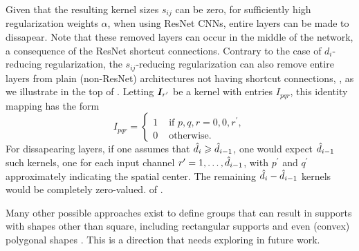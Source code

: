 Given that the resulting kernel sizes $s_{ij}$ can be zero, for sufficiently high regularization weights $\alpha$, when using ResNet CNNs, entire layers can be made to dissapear. Note that these removed layers can occur in the middle of the network, a consequence of the ResNet shortcut connections. Contrary to the case of $d_{i}$-reducing regularization, the $s_{ij}$-reducing regularization can also remove entire layers from plain (non-ResNet) architectures not having shortcut connections,  , as we illustrate in the top of . Letting $\bm{I}_{r^\prime}$ be a kernel with entries $I_{pqr}$, this identity mapping has the form
\begin{equation}
  I_{pqr} = 
    \begin{cases}
      1 & \textrm{ if } p,q,r = 0,0,r^\prime, \\
      0 & \textrm{ otherwise. }
    \end{cases}  
\end{equation}
For dissapearing layers, if one assumes that $\hat{d}_i \geqslant \hat{d}_{i-1}$, one would expect $\hat{d}_{i-1}$ such kernels, one for each input channel $r^\prime = 1, \ldots, \hat{d}_{i-1}$,  with $p^\prime$ and $q^\prime$ approximately indicating the spatial center. The remaining $\hat{d}_i - \hat{d}_{i-1}$ kernels would be completely zero-valued.   of  .

Many other possible approaches exist to define groups that can result in supports with shapes other than square, including rectangular supports and even (convex) polygonal shapes \cite{Bach}. This is a direction that needs exploring in future work.







